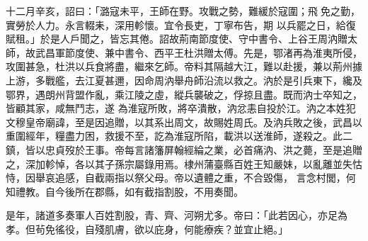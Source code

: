 \begin{pinyinscope}
 十二月辛亥，詔曰：「潞寇未平，王師在野。攻戰之勢，難緩於寇圍；飛免之勤，實勞於人力。永言輟耒，深用軫懷。宜令長吏，丁寧布告，期
 以兵罷之日，給復賦租。」於是人戶聞之，皆忘其倦。詔故荊南節度使、守中書令、上谷王周汭贈太師，故武昌軍節度使、兼中書令、西平王杜洪贈太傅。先是，鄂渚再為淮夷所侵，攻圍甚急，杜洪以兵食將盡，繼來乞師。帝料其隔越大江，難以赴援，兼以荊州據上游，多戰艦，去江夏甚邇，因命周汭舉舟師沿流以救之。汭於是引兵東下，纔及鄂界，遇朗州背盟作亂，乘江陵之虛，縱兵襲破之，俘掠且盡。既而汭士卒知之，皆顧其家，咸無鬥志，遂
 為淮寇所敗，將卒潰散，汭忿恚自投於江。汭之本姓犯文穆皇帝廟諱，至是因追贈，以其系出周文，故賜姓周氏。及汭兵敗之後，武昌以重圍經年，糧盡力困，救援不至，訖為淮寇所陷，載洪以送淮師，遂殺之。此二鎮，皆以忠貞歿於王事。帝每言諸籓屏翰經綸之業，必首痛汭、洪之薨，至是追贈之，深加軫悼，各以其子孫宗屬錄用焉。棣州蒲臺縣百姓王知嚴妹，以亂離並失怙恃，因舉哀追感，自截兩指以祭父母。帝以遺體之重，不合毀傷，
 言念村閭，何知禮教。自今後所在郡縣，如有截指割股，不用奏聞。


是年，諸道多奏軍人百姓割股，青、齊、河朔尤多。帝曰：「此若因心，亦足為孝。但茍免徭役，自殘肌膚，欲以庇身，何能療疾？並宜止絕。」



\end{pinyinscope}